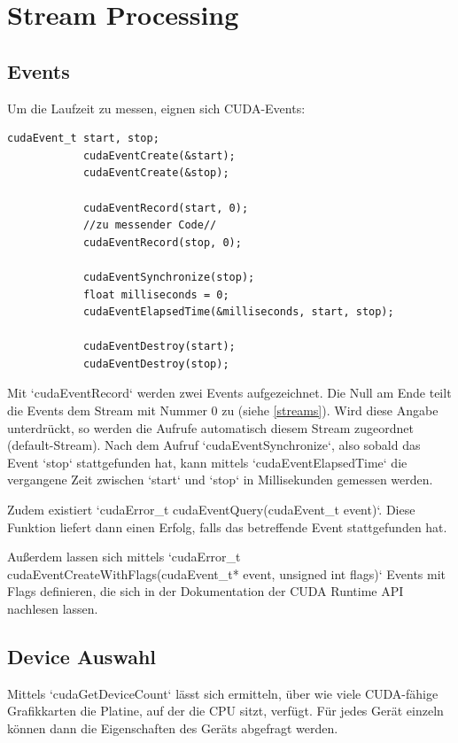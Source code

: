 		\section{Stream Processing}
		\subsection{Events}
        Um die Laufzeit zu messen, eignen sich CUDA-Events:		
		\begin{lstlisting}[caption=Events]
			cudaEvent_t start, stop;
			cudaEventCreate(&start);
			cudaEventCreate(&stop);

			cudaEventRecord(start, 0);
			//zu messender Code//
			cudaEventRecord(stop, 0);	
		
			cudaEventSynchronize(stop);
			float milliseconds = 0;
			cudaEventElapsedTime(&milliseconds, start, stop);
		
			cudaEventDestroy(start);
			cudaEventDestroy(stop);
		\end{lstlisting}

		Mit \li`cudaEventRecord` werden zwei Events aufgezeichnet. Die Null am Ende teilt die Events dem Stream mit Nummer 0 zu (siehe \ref{streams}). Wird diese Angabe unterdrückt, so werden die Aufrufe automatisch diesem \Gls{Stream} zugeordnet (default-\Gls{Stream}). Nach dem Aufruf \li`cudaEventSynchronize`, also sobald das Event \li`stop` stattgefunden hat, kann mittels \li`cudaEventElapsedTime` die vergangene Zeit zwischen \li`start` und \li`stop` in Millisekunden gemessen werden.
		
		Zudem existiert \li`cudaError_t cudaEventQuery(cudaEvent_t event)`. Diese Funktion liefert dann einen Erfolg, falls das betreffende Event stattgefunden hat.
		
		Außerdem lassen sich mittels \li`cudaError_t cudaEventCreateWithFlags(cudaEvent_t* event, unsigned int flags)` Events mit Flags definieren, die sich in der Dokumentation der CUDA Runtime \Gls{API} nachlesen lassen. \autocite{cudaRTAPI}
		
      
		\subsection{Device Auswahl}
		Mittels \li`cudaGetDeviceCount` lässt sich ermitteln, über wie viele CUDA-fähige Grafikkarten die Platine, auf der die CPU sitzt, verfügt. Für jedes Gerät einzeln können dann die Eigenschaften des Geräts abgefragt werden.
		
